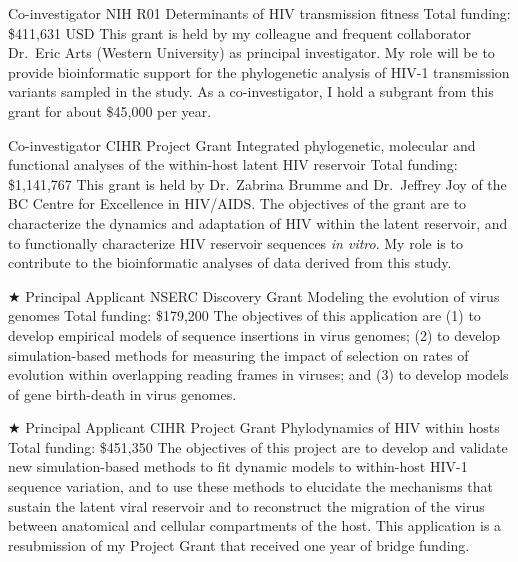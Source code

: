 {Co-investigator}
{NIH R01}  %
{Determinants of HIV transmission fitness}
{Total funding: \$411,631 USD}
{
This grant is held by my colleague and frequent collaborator Dr.~Eric Arts (Western University) as principal investigator.
My role will be to provide bioinformatic support for the phylogenetic analysis of HIV-1 transmission variants sampled in the study.
As a co-investigator, I hold a subgrant from this grant for about \$45,000 per year.
}


{Co-investigator}
{CIHR Project Grant}  %
{Integrated phylogenetic, molecular and functional analyses of the within-host latent HIV reservoir}
{Total funding: \$1,141,767}
{
This grant is held by Dr.~Zabrina Brumme and Dr.~Jeffrey Joy of the BC Centre for Excellence in HIV/AIDS.
The objectives of the grant are to characterize the dynamics and adaptation of HIV within the latent reservoir, and to functionally characterize HIV reservoir sequences \textit{in vitro}.
My role is to contribute to the bioinformatic analyses of data derived from this study.
}



{$\bigstar$ Principal Applicant}
{NSERC Discovery Grant}
{Modeling the evolution of virus genomes}
{Total funding: \$179,200} %
{
The objectives of this application are (1) to develop empirical models of sequence insertions in virus genomes; (2) to develop simulation-based methods for measuring the impact of selection on rates of evolution within overlapping reading frames in viruses; and (3) to develop models of gene birth-death in virus genomes.\\
}



{$\bigstar$ Principal Applicant}
{CIHR Project Grant} %
{Phylodynamics of HIV within hosts}
{Total funding: \$451,350}
{
The objectives of this project are to develop and validate new simulation-based methods to fit dynamic models to within-host HIV-1 sequence variation, and to use these methods to elucidate the mechanisms that sustain the latent viral reservoir and to reconstruct the migration of the virus between anatomical and cellular compartments of the host.
This application is a resubmission of my Project Grant that received one year of bridge funding.\\ 
}


